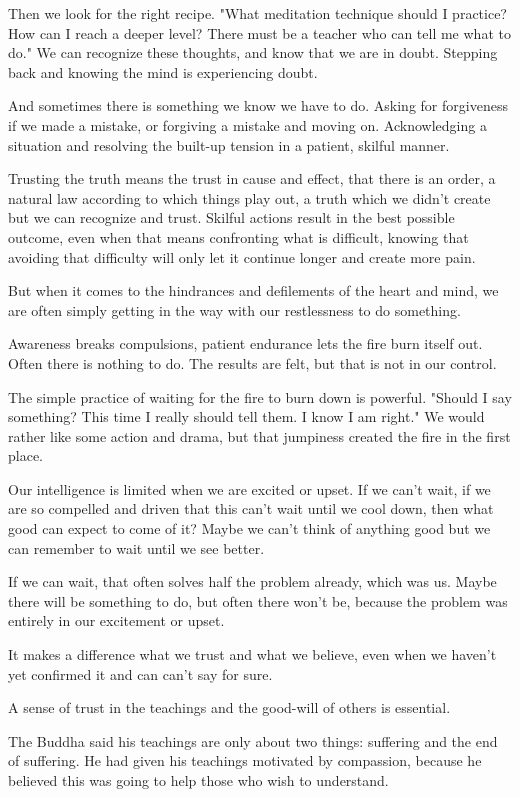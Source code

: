 Then we look for the right recipe. "What meditation technique should I
practice? How can I reach a deeper level? There must be a teacher who
can tell me what to do." We can recognize these thoughts, and know that
we are in doubt. Stepping back and knowing the mind is experiencing
doubt.

And sometimes there is something we know we have to do. Asking for
forgiveness if we made a mistake, or forgiving a mistake and moving on.
Acknowledging a situation and resolving the built-up tension in a
patient, skilful manner.

Trusting the truth means the trust in cause and effect, that there is an
order, a natural law according to which things play out, a truth which
we didn't create but we can recognize and trust. Skilful actions result
in the best possible outcome, even when that means confronting what is
difficult, knowing that avoiding that difficulty will only let it
continue longer and create more pain.

But when it comes to the hindrances and defilements of the heart and
mind, we are often simply getting in the way with our restlessness to do
something.

Awareness breaks compulsions, patient endurance lets the fire burn
itself out. Often there is nothing to do. The results are felt, but that
is not in our control.

The simple practice of waiting for the fire to burn down is powerful.
"Should I say something? This time I really should tell them. I know I
am right." We would rather like some action and drama, but that
jumpiness created the fire in the first place.

Our intelligence is limited when we are excited or upset. If we can't
wait, if we are so compelled and driven that this can't wait until we
cool down, then what good can expect to come of it? Maybe we can't think
of anything good but we can remember to wait until we see better.

If we can wait, that often solves half the problem already, which was
us. Maybe there will be something to do, but often there won't be,
because the problem was entirely in our excitement or upset.

It makes a difference what we trust and what we believe, even when we
haven't yet confirmed it and can can't say for sure.

A sense of trust in the teachings and the good-will of others is
essential.

The Buddha said his teachings are only about two things: suffering and
the end of suffering. He had given his teachings motivated by
compassion, because he believed this was going to help those who wish to
understand.

